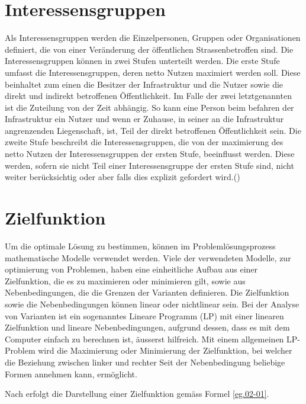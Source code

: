 \section{Interessensgruppen}
\label{sec:Inter.gruppen}

Als Interessensgruppen werden die Einzelpersonen, Gruppen oder Organisationen definiert, die von einer Veränderung der öffentlichen Strassenbetroffen sind. Die Interessensgruppen können in zwei Stufen unterteilt werden. Die erste Stufe umfasst die Interessensgruppen, deren netto Nutzen maximiert werden soll. Diese beinhaltet zum einen die Besitzer der Infrastruktur und die Nutzer sowie die direkt und indirekt betroffenen Öffentlichkeit. Im Falle der zwei letztgenannten ist die Zuteilung von der Zeit abhängig. So kann eine Person beim befahren der Infrastruktur ein Nutzer und wenn er Zuhause, in seiner an die Infrastruktur angrenzenden Liegenschaft, ist, Teil der direkt betroffenen Öffentlichkeit sein. Die zweite Stufe beschreibt die Interessensgruppen, die von der maximierung des netto Nutzen der Interessensgruppen der ersten Stufe, beeinflusst werden. Diese werden, sofern sie nicht Teil einer Interessensgruppe der ersten Stufe sind, nicht weiter berücksichtig oder aber falls dies explizit gefordert wird.(\cite{Adeyetall2019})

\section{Zielfunktion}
\label{sec:Zielf}

Um die optimale Lösung zu bestimmen, können im Problemlösungsprozess mathematische Modelle verwendet werden. Viele der verwendeten Modelle, zur optimierung von Problemen, haben eine einheitliche Aufbau aus einer Zielfunktion, die es zu maximieren oder minimieren gilt, sowie aus Nebenbedingungen, die die Grenzen der Varianten definieren. Die Zielfunktion sowie die Nebenbedingungen können linear oder nichtlinear sein.
Bei der Analyse von Varianten ist ein sogenanntes Lineare Programm (LP) mit einer linearen Zielfunktion und lineare Nebenbedingungen, aufgrund dessen, dass es mit dem Computer einfach zu berechnen ist, äusserst hilfreich. Mit einem allgemeinen LP-Problem wird die Maximierung oder Minimierung der Zielfunktion, bei welcher die Beziehung zwischen linker und rechter Seit der Nebenbedingung beliebige Formen annehmen kann, ermöglicht. \cite{Adey2019}

Nach \cite{Adey2019} erfolgt die Darstellung einer Zielfunktion gemäss Formel \ref{eg.02-01}.

